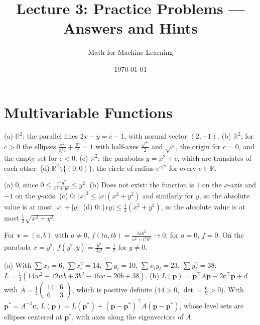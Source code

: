 \documentclass[11pt]{article}
\title{Lecture 3: Practice Problems --- Answers and Hints}
\author{Math for Machine Learning}
\date{\today}
\begin{document}
\maketitle

\section*{Multivariable Functions}

\begin{description}[leftmargin=0pt, itemsep=0.3em]
    \item[\ref{pr:level-sets}.] (a) $\mathbb{R}^2$; the parallel lines $2x - y = c - 1$, with normal vector $(2, -1)$. (b) $\mathbb{R}^2$; for $c > 0$ the ellipses $\frac{x^2}{c/4} + \frac{y^2}{c} = 1$ with half-axes $\frac{\sqrt{c}}{2}$ and $\sqrt{c}$, the origin for $c = 0$, and the empty set for $c < 0$. (c) $\mathbb{R}^2$; the parabolas $y = x^2 + c$, which are translates of each other. (d) $\mathbb{R}^2 \setminus \{(0, 0)\}$; the circle of radius $e^{c/2}$ for every $c \in \mathbb{R}$.
    \item[\ref{pr:limits}.] (a) $0$, since $0 \leq \frac{x^2 y^2}{x^2 + y^2} \leq y^2$. (b) Does not exist: the function is $1$ on the $x$-axis and $-1$ on the $y$-axis. (c) $0$: $|x|^3 \leq |x|(x^2 + y^2)$ and similarly for $y$, so the absolute value is at most $|x| + |y|$. (d) $0$: $|xy| \leq \frac{1}{2}(x^2 + y^2)$, so the absolute value is at most $\frac{1}{2}\sqrt{x^2 + y^2}$.
    \item[\ref{pr:lines-not-enough}.] For $\mathbf{v} = (a, b)$ with $a \neq 0$, $f(ta, tb) = \frac{tab^2}{a^2 + t^2 b^4} \to 0$; for $a = 0$, $f = 0$. On the parabola $x = y^2$, $f(y^2, y) = \frac{y^4}{2y^4} = \frac{1}{2}$ for $y \neq 0$.
    \item[\ref{pr:mse-quadratic}.] (a) With $\sum x_i = 6$, $\sum x_i^2 = 14$, $\sum y_i = 10$, $\sum x_i y_i = 23$, $\sum y_i^2 = 38$: $L = \frac{1}{3}(14w^2 + 12wb + 3b^2 - 46w - 20b + 38)$. (b) $L(\mathbf{p}) = \mathbf{p}^\top A\mathbf{p} - 2\mathbf{c}^\top\mathbf{p} + d$ with $A = \frac{1}{3}\begin{pmatrix} 14 & 6 \\ 6 & 3 \end{pmatrix}$, which is positive definite ($14 > 0$, $\det = \frac{6}{9} > 0$). With $\mathbf{p}^* = A^{-1}\mathbf{c}$, $L(\mathbf{p}) = L(\mathbf{p}^*) + (\mathbf{p} - \mathbf{p}^*)^\top A(\mathbf{p} - \mathbf{p}^*)$, whose level sets are ellipses centered at $\mathbf{p}^*$, with axes along the eigenvectors of $A$.
\end{description}
\end{document}

